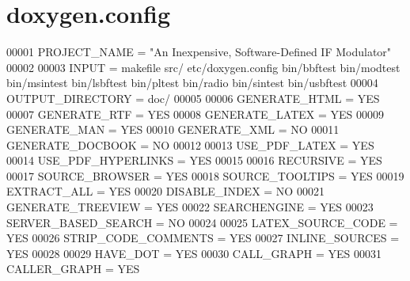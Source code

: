 \hypertarget{doxygen_8config_source}{\section{doxygen.\+config}
\label{doxygen_8config_source}
}

\begin{DoxyCode}
00001 PROJECT\_NAME = "An Inexpensive, Software-Defined IF Modulator"
00002 
00003 INPUT = makefile src/ etc/doxygen.config bin/bbftest bin/modtest bin/msintest bin/lsbftest bin/pltest
       bin/radio bin/sintest bin/usbftest
00004 OUTPUT\_DIRECTORY = doc/
00005 
00006 GENERATE\_HTML = YES
00007 GENERATE\_RTF = YES
00008 GENERATE\_LATEX = YES
00009 GENERATE\_MAN = YES
00010 GENERATE\_XML = NO
00011 GENERATE\_DOCBOOK = NO
00012 
00013 USE\_PDF\_LATEX = YES
00014 USE\_PDF\_HYPERLINKS = YES
00015 
00016 RECURSIVE = YES
00017 SOURCE\_BROWSER = YES
00018 SOURCE\_TOOLTIPS = YES
00019 EXTRACT\_ALL = YES
00020 DISABLE\_INDEX = NO
00021 GENERATE\_TREEVIEW = YES
00022 SEARCHENGINE = YES
00023 SERVER\_BASED\_SEARCH = NO
00024 
00025 LATEX\_SOURCE\_CODE = YES
00026 STRIP\_CODE\_COMMENTS = YES
00027 INLINE\_SOURCES = YES
00028 
00029 HAVE\_DOT = YES
00030 CALL\_GRAPH = YES
00031 CALLER\_GRAPH = YES
\end{DoxyCode}
